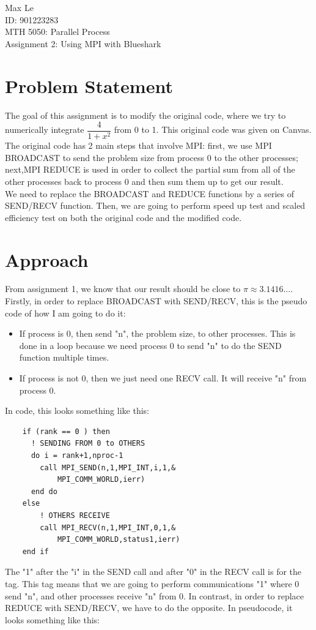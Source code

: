 \documentclass[12pt]{article}
\begin{document}
	\begin{flushleft}
		Max Le \\
		ID: 901223283\\
		MTH 5050: Parallel Process\\
		Assignment 2: Using MPI with Blueshark  
	\end{flushleft}


	\section{Problem Statement}
	
	The goal of this assignment is to modify the original code, where we try to numerically integrate $\displaystyle\dfrac{4}{1+x^2}$ from 0 to 1. This original code was given on Canvas. \newline\\
	The original code has 2 main steps that involve MPI: first, we use MPI BROADCAST to send the problem size from process 0 to the other processes; next,MPI REDUCE is used in order to collect the partial sum from all of the other processes back to process 0 and then sum them up to get our result. \newline\\
	We need to replace the BROADCAST and REDUCE functions by a series of SEND/RECV function. Then, we are going to perform speed up test and scaled efficiency test on both the original code and the modified code. 
	
	\section{Approach}
	
	From assignment 1, we know that our result should be close to $\pi \approx 3.1416...$.  Firstly, in order to replace BROADCAST with SEND/RECV, this is the pseudo code of how I am going to do it:
	
	\begin{itemize}
		\item  If process is 0, then send "n", the problem size, to other processes. This is done in a loop because we need process 0 to send "n" to do the SEND function multiple times. 
		\item  If process is not 0, then we just need one RECV call.  It will receive "n" from process 0. 
	\end{itemize}

	\noindent
	In code, this looks something like this: 
	\begin{lstlisting}
	if (rank == 0 ) then
	  ! SENDING FROM 0 to OTHERS
	  do i = rank+1,nproc-1
		call MPI_SEND(n,1,MPI_INT,i,1,&
			MPI_COMM_WORLD,ierr)
	  end do
	else
	    ! OTHERS RECEIVE 
		call MPI_RECV(n,1,MPI_INT,0,1,&
			MPI_COMM_WORLD,status1,ierr)
	end if		
	\end{lstlisting}
	\noindent
	The "1" after the "i" in the SEND call and after "0" in the RECV call is for the tag. This tag means that we are going to perform communications "1" where 0 send "n", and other processes receive "n" from 0. In contrast, in order to replace REDUCE with SEND/RECV, we have to do the opposite.  In pseudocode, it looks something like this: 
\end{document}

